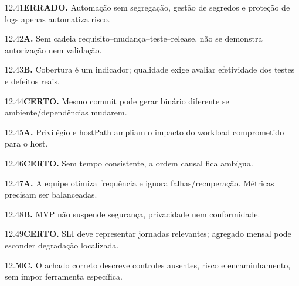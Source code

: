 \begin{solucao}{12.41}\textbf{ERRADO.} Automação sem segregação, gestão de segredos e proteção de logs apenas automatiza risco.\end{solucao}
\begin{solucao}{12.42}\textbf{A.} Sem cadeia requisito--mudança--teste--release, não se demonstra autorização nem validação.\end{solucao}
\begin{solucao}{12.43}\textbf{B.} Cobertura é um indicador; qualidade exige avaliar efetividade dos testes e defeitos reais.\end{solucao}
\begin{solucao}{12.44}\textbf{CERTO.} Mesmo commit pode gerar binário diferente se ambiente/dependências mudarem.\end{solucao}
\begin{solucao}{12.45}\textbf{A.} Privilégio e hostPath ampliam o impacto do workload comprometido para o host.\end{solucao}
\begin{solucao}{12.46}\textbf{CERTO.} Sem tempo consistente, a ordem causal fica ambígua.\end{solucao}
\begin{solucao}{12.47}\textbf{A.} A equipe otimiza frequência e ignora falhas/recuperação. Métricas precisam ser balanceadas.\end{solucao}
\begin{solucao}{12.48}\textbf{B.} MVP não suspende segurança, privacidade nem conformidade.\end{solucao}
\begin{solucao}{12.49}\textbf{CERTO.} SLI deve representar jornadas relevantes; agregado mensal pode esconder degradação localizada.\end{solucao}
\begin{solucao}{12.50}\textbf{C.} O achado correto descreve controles ausentes, risco e encaminhamento, sem impor ferramenta específica.\end{solucao}
